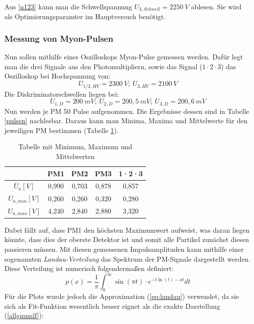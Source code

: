             Aus \ref{n123} kann man die Schwellspannung $U_{3,Schwell} = 2250\ \unit{V}$ ablesen. Sie wird als Optimierungsparamter im Hauptversuch benötigt.
            
            \subsubsection{Messung von Myon-Pulsen}
            Nun sollen mithilfe eines Oszilloskops Myon-Pulse gemessen werden. Dafür legt man die drei Signale aus den Photomultipliern, sowie das Signal ($1\cdot 2 \cdot 3$) das Oszilloskop bei Hochspannung von: $$ U_{1/2,HV} = 2300\ \unit{V};\ U_{3,HV} = 2100\ \unit{V} $$
            Die Diskriminatorschwellen liegen bei: $$ U_{1,D} = 200\ \unit{mV};\ U_{2,D} = 200,5\ \unit{mV};\ U_{3,D} = 200,6\ \unit{mV} $$
            Nun werden je PM 50 Pulse aufgenommen. Die Ergebnisse dessen sind in Tabelle \ref{pulsen} nachlesbar. Daraus kann man Minima, Maxima und Mittelwerte für den jeweiligen PM bestimmen (Tabelle \ref{MWs}).
            \begin{table}[ht]
                \centering
                \begin{tabular}{c||c|c|c|c}
                    & PM1   & PM2   & PM3 & 1·2·3\\
                    \hline $\overline U_{n}  [\unit{V}]$  & 0,990 & 0,703 & 0,878 & 0,857\\
                    $U_{n,min} [\unit{V}]$& 0,260 & 0,260 & 0,320 & 0,280\\
                    $U_{n,max} [\unit{V}]$& 4,240 & 2,840 & 2,880 & 3,320\\ 
                \end{tabular}
                \caption{Tabelle mit Minimum, Maximum und Mittelwerten}
                \label{MWs}
            \end{table}
            Dabei fällt auf, dass PM1 den höchsten Maximumwert aufweist, was daran liegen könnte, dass dies der oberste Detektor ist und somit alle Partikel zunächst diesen passieren müssen. 
            Mit diesen gemessenen Impulsamplituden kann mithilfe einer sogenannten \textit{Landau-Verteilung} das Spektrum der PM-Signale dargestellt werden. Diese Verteilung ist numerisch folgendermaßen definiert:
            \begin{equation}
            p(x) = \frac{1}{\pi} \int_{0}^{\infty} \sin(\pi t)\cdot e^{-t\ln(t)-xt} dt
            \label{allgnumlf}
            \end{equation}
            Für die Plots wurde jedoch die Approximation (\ref{eq:landau}) verwendet, da sie sich als Fit-Funktion wesentlich besser eignet als die exakte Darstellung (\ref{allgnumlf}):
